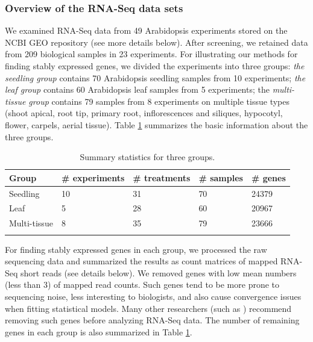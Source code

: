 \documentclass[letterpaper,12pt]{article}
\begin{document}
\subsubsection*{Overview of the RNA-Seq data sets}
We examined RNA-Seq data from 49 Arabidopsis experiments stored on the NCBI
GEO repository (see more details below). After screening, we retained data
from 209 biological samples in 23 experiments.  For illustrating our methods
for finding stably expressed genes, we divided the experiments into three
groups: \textit{the seedling group} contains  70 Arabidopsis seedling samples
from 10 experiments; \textit{ the leaf group} contains 60 Arabidopsis leaf
samples from 5 experiments;  the \textit{multi-tissue group} contains 79
samples from 8 experiments on multiple tissue types (shoot apical, root tip,
primary root, inflorescences and siliques, hypocotyl, flower, carpels, aerial
tissue).  Table \ref{table:TableSet3} summarizes the basic information about
the three groups.
\begin{table}[h]
    \centering
    \caption{Summary statistics for three groups.}
    \begin{tabular}{lp{3cm}p{3cm}p{2cm}p{2cm}} \hline
	Group & \#  experiments & \# treatments  & \# samples & \# genes \\ \hline
	Seedling &10 & 31 &70  &24379  \\
	Leaf &5 & 28 & 60 &20967  \\
	Multi-tissue &8 &35  &79  & 23666\\ \hline
	\label{table:TableSet3}
    \end{tabular}
\end{table}

For finding stably expressed genes in each group, we processed the raw
sequencing data and summarized the results as count matrices of mapped RNA-Seq
short reads (see details below).  We removed genes with low mean numbers (less
than 3) of mapped read counts.  Such genes tend to be more prone to sequencing
noise, less interesting to biologists, and also cause convergence issues when
fitting statistical models. Many other researchers (such as \citealt{anders2013count})
recommend removing such genes before analyzing RNA-Seq data.  The number of
remaining genes in each group is also summarized in Table
\ref{table:TableSet3}.
\end{document}
